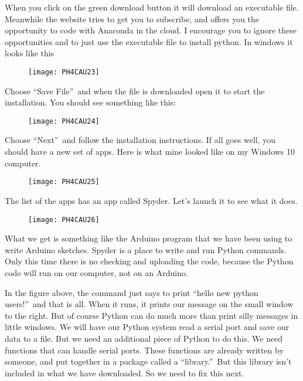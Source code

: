 When you click on the green download button it will download an executable file. Meanwhile the website tries to get you to subscribe, and offers you the opportunity to code with Anaconda in the cloud. I encourage you to ignore these opportunities and to just use the executable file to install python. In windows it looks like this 

\begin{figure}[h!]
	\centering
	\texttt{[image: PH4CAU23]}
\end{figure}

Choose \textquotedblleft Save File\textquotedblright\ and when the file is
downloaded open it to start the installation. You should see something like
this: 

\begin{figure}[h!]
	\centering
	\texttt{[image: PH4CAU24]}
\end{figure}

Choose \textquotedblleft Next\textquotedblright\ and follow the installation
instructions. If all goes well, you should have a new set of apps. Here is
what mine looked like on my Windows 10 computer. 

\begin{figure}[h!]
	\centering
	\texttt{[image: PH4CAU25]}
\end{figure}

The list of the apps has an app called Spyder. Let's launch it to see what it does.

\begin{figure}[h!]
	\centering
	\texttt{[image: PH4CAU26]}
\end{figure}

What we get is something like the Arduino program that we have been using to
write Arduino sketches. Spyder is a place to write and run Python commands.
Only this time there is no checking and uploading the code, because the
Python code will run on our computer, not on an Arduino.

In the figure above, the command just says to print \textquotedblleft hello
new python users!\textquotedblright\ and that is all. When it runs, it
prints our message on the small window to the right. But of course Python
can do much more than print silly messages in little windows. We will have
our Python system read a serial port and save our data to a file. But we
need an additional piece of Python to do this. We need functions that can
handle serial ports. These functions are already written by someone, and put
together in a package called a \textquotedblleft library.\textquotedblright\
But this library isn't included in what we have downloaded. So we need to
fix this next.

